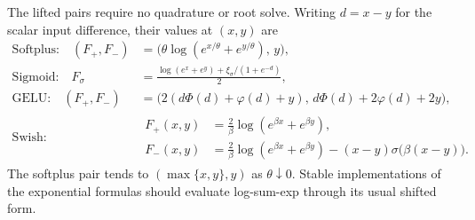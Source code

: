 The lifted pairs require no quadrature or root solve. Writing $d=x-y$ for the scalar input difference, their values at $(x,y)$ are
\begin{align}
    \text{Softplus:}\quad (F_+,F_-)&=\bigl(\theta\log(e^{x/\theta}+e^{y/\theta}),\,y\bigr),
    \label{eq:softplus_dc_closed}\\
    \text{Sigmoid:}\quad F_\sigma&=\frac{\log(e^x+e^y)+\xi_\sigma/(1+e^{-d})}{2},
    \label{eq:sigmoid_dc_closed}\\
    \text{GELU:}\quad (F_+,F_-)&=\bigl(2(d\Phi(d)+\varphi(d)+y),\,d\Phi(d)+2\varphi(d)+2y\bigr),
    \label{eq:gelu_dc_closed}\\
    \text{Swish:}\quad &\begin{aligned}
        F_+(x,y)&=\frac{2}{\beta}\log(e^{\beta x}+e^{\beta y}),\\
        F_-(x,y)&=\frac{2}{\beta}\log(e^{\beta x}+e^{\beta y})-(x-y)\sigma\bigl(\beta(x-y)\bigr).
    \end{aligned}
    \label{eq:swish_dc_closed}
\end{align}
The softplus pair tends to $(\max\{x,y\},y)$ as $\theta\downarrow0$.
Stable implementations of the exponential formulas should evaluate log-sum-exp through its usual shifted form.


